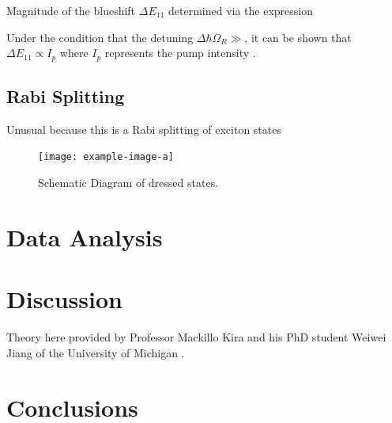 Magnitude of the blueshift $\Delta E_{11}$ determined via the expression


Under the condition that the detuning $\Delta \hbar \Omega_R\gg $, it can be shown that $\Delta E_{11} \propto I_p$ where $I_p$ represents the pump intensity \cite{mack}.
\subsection{Rabi Splitting}

Unusual because this is a Rabi splitting of exciton states

\begin{figure}[H]
	\centering
	\texttt{[image: example-image-a]}
	\caption{Schematic Diagram of dressed states. }
\end{figure}

\section{Data Analysis}

\section{Discussion}

Theory here provided by Professor Mackillo Kira and his PhD student Weiwei Jiang of the University of Michigan \cite{mack2019}.



\section{Conclusions}
